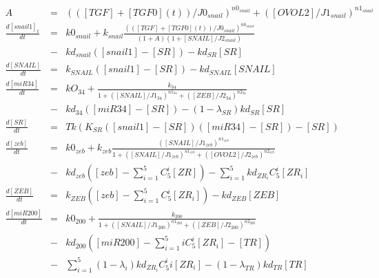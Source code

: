 \documentclass{article}
\begin{document}
{\footnotesize{}\allowdisplaybreaks
	\begin{eqnarray*}
		A & = & \left(\left(\left[TGF\right]+\left[TGF0\right](t)\right)/J0_{snail}\right)^{n0_{snail}}+\left(\left[OVOL2\right]/J1_{snail}\right)^{n1_{snail}}\\
		\frac{d\left[snail1\right]_{t}}{dt} & = & k0_{snail}+k_{snail}\frac{\left(\left(\left[TGF\right]+\left[TGF0\right](t)\right)/J0_{snail}\right)^{n0_{snail}}}{\left(1+A\right)\left(1+\left[SNAIL\right]/J2_{snail}\right)}\\
		& - & kd_{snail}\left(\left[snail1\right]-\left[SR\right]\right)-kd_{SR}\left[SR\right]\\
		\frac{d\left[SNAIL\right]}{dt} & = & k_{SNAIL}\left(\left[snail1\right]-\left[SR\right]\right)-kd_{SNAIL}\left[SNAIL\right]\\
		\frac{d\left[miR34\right]}{dt} & = & kO_{34}+\frac{k_{34}}{1+\left(\left[SNAIL\right]/J1_{34}\right)^{n1_{34}}+\left(\left[ZEB\right]/J2_{34}\right)^{n2_{34}}}\\
		& - & kd_{34}\left(\left[miR34\right]-\left[SR\right]\right)-\left(1-\lambda_{SR}\right)kd_{SR}\left[SR\right]\\
		\frac{d\left[SR\right]}{dt} & = & Tk\left(K_{SR}\left(\left[snail1\right]-\left[SR\right]\right)\left(\left[miR34\right]-\left[SR\right]\right)-\left[SR\right]\right)\\
		\frac{d\left[zeb\right]}{dt} & = & k0_{zeb}+k_{zeb}\frac{\left(\left[SNAIL\right]/J1_{zeb}\right)^{n1_{zeb}}}{1+\left(\left[SNAIL\right]/J1_{zeb}\right)^{n1_{zeb}}+\left(\left[OVOL2\right]/J2_{zeb}\right)^{n2_{zeb}}}\\
		& - & kd_{zeb}\left(\left[zeb\right]-\sum_{i=1}^{5}C_{5}^{i}\left[ZR\right]\right)-\sum_{i=1}^{5}kd_{ZR_{i}}C_{5}^{i}\left[ZR_{i}\right]\\
		\frac{d\left[ZEB\right]}{dt} & = & k_{ZEB}\left(\left[zeb\right]-\sum_{i=1}^{5}C_{5}^{i}\left[ZR_{i}\right]\right)-kd_{ZEB}\left[ZEB\right]\\
		\frac{d\left[miR200\right]}{dt} & = & k0_{200}+\frac{k_{200}}{1+\left(\left[SNAIL\right]/J1_{200}\right)^{n1_{200}}+\left(\left[ZEB\right]/J2_{200}\right)^{n2_{200}}}\\
		& - & kd_{200}\left(\left[miR200\right]-\sum_{i=1}^{5}iC_{5}^{i}\left[ZR_{i}\right]-\left[TR\right]\right)\\
		& - & \sum_{i=1}^{5}\left(1-\lambda_{i}\right)kd_{ZR_{i}}C_{5}^{i}i\left[ZR_{i}\right]-\left(1-\lambda_{TR}\right)kd_{TR}\left[TR\right]\\

\end{eqnarray*}}
\end{document}
